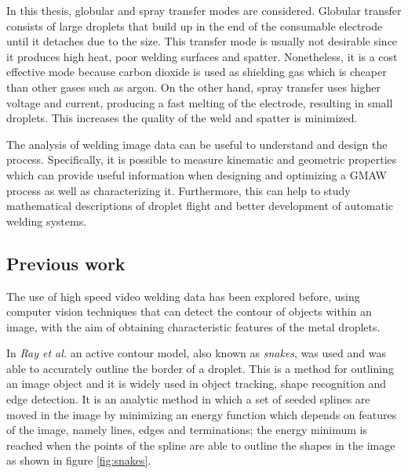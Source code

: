 In this thesis, globular and spray transfer modes are considered. Globular transfer consists of large droplets that build up in the end of the consumable electrode until it detaches due to the size. This transfer mode is usually not desirable since it produces high heat, poor welding surfaces and spatter. Nonetheless, it is a cost effective mode because carbon dioxide is used as shielding gas which is cheaper than other gases such as argon. On the other hand, spray transfer uses higher voltage and current, producing a fast melting of the electrode, resulting in small droplets. This increases the quality of the weld and spatter is minimized.

The analysis of welding image data can be useful to understand and design the process. Specifically, it is possible to measure kinematic and geometric properties which  can provide useful information when designing and optimizing a GMAW process as well as characterizing it. Furthermore, this can help to study mathematical descriptions of droplet flight and better development of automatic welding systems.

\subsection{Previous work}

The use of high speed video welding data has been explored before, using computer vision techniques that can detect the contour of objects within an image, with the aim of obtaining characteristic features of the metal droplets. 

In \textit{Ray et al.} \cite{Ray} an active contour model, also known as \textit{snakes}, was used and was able to accurately outline the border of a droplet. This is a method for outlining an image object and it is widely used in object tracking, shape recognition and edge detection. It is an analytic method in which a set of seeded splines are moved in the image by minimizing an energy function which depends on features of the image, namely lines, edges and terminations; the energy minimum is reached when the points of the spline are able to outline the shapes in the image \cite{Kass} as shown in figure \ref{fig:snakes}.

